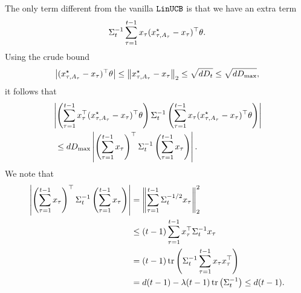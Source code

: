 \documentclass[letterpaper,11pt]{article}
\begin{document}
The only term different from the vanilla $\texttt{LinUCB}$ is that we have an extra term 
$$
\Sigma_t^{-1} \sum_{\tau=1}^{t-1} x_{\tau} (x^\star_{\tau,A_\tau} - x_\tau)^\top \theta.
$$
Using the crude bound
\begin{equation*}
    \left|(x^\star_{\tau,A_\tau} - x_\tau)^\top \theta\right| \leq \left\|x^\star_{\tau,A_\tau} - x_\tau\right\|_2 \leq \sqrt{d D_t} \leq \sqrt{d D_{\max}} ,
\end{equation*}
it follows that 
\begin{equation*}
\begin{aligned}
    &\left|\left(\sum_{\tau=1}^{t-1} x_{\tau}^\top (x^\star_{\tau,A_\tau} - x_\tau)^\top \theta\right) \Sigma_t^{-1} \left(\sum_{\tau=1}^{t-1} x_{\tau} (x^\star_{\tau,A_\tau} - x_\tau)^\top \theta\right)\right| \\ 
    &~\leq d D_{\max} \left|\left(\sum_{\tau=1}^{t-1} x_{\tau}\right)^\top \Sigma_t^{-1} \left(\sum_{\tau=1}^{t-1} x_{\tau}\right) \right|.
\end{aligned}
\end{equation*}
We note that 
\begin{equation*}
\begin{aligned}
    \left|\left(\sum_{\tau=1}^{t-1} x_{\tau}\right)^\top \Sigma_t^{-1} \left(\sum_{\tau=1}^{t-1} x_{\tau}\right) \right| &= \left\|\sum_{\tau=1}^{t-1} \Sigma_{t}^{-1/2} x_\tau\right\|_2^2\\
    &\leq (t-1) \sum_{\tau=1}^{t-1} x^\top_\tau \Sigma_{t}^{-1} x_\tau\\
    &= (t-1) \operatorname{tr}\left(\Sigma_t^{-1} \sum_{\tau=1}^{t-1} x_\tau x^\top_{\tau}\right)\\
    &= d(t-1) - \lambda (t-1) \operatorname{tr}\left(\Sigma^{-1}_t\right) \leq d(t-1). 
\end{aligned}
\end{equation*}
\end{document}
